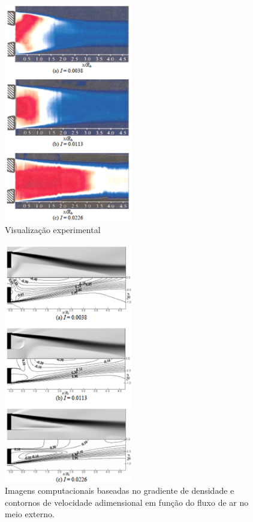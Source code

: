 \begin{figure}[!ht]
	\centering
	\includegraphics[width=0.5\textwidth]{foto07-bourdon2003.png}
	\caption[Visualização experimental]{Visualização experimental \cite{Bourdon2003Feb}}
	\label{fig7:bourdon2003}
\end{figure}

\begin{figure}[!ht]
	\centering
	\includegraphics[width=0.5\textwidth]{foto08-base-lee&kim.png}
	\caption[Imagens computacionais baseadas no gradiente de densidade e contornos de velocidade adimensional em função do fluxo de ar no meio externo.]{Imagens computacionais baseadas no gradiente de densidade e contornos de velocidade adimensional em função do fluxo de ar no meio externo. \cite{Lee2006Sep}}
	\label{fig8:lee2006}
\end{figure}

